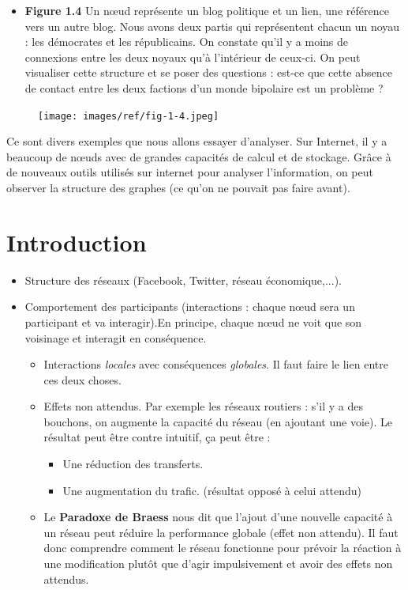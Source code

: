 \begin{itemize}
	\item \textbf{Figure 1.4} Un nœud représente un blog politique et un lien, une référence vers un autre blog. Nous avons deux partis qui représentent chacun un noyau : les démocrates et les républicains. On constate qu'il y a moins de connexions entre les deux noyaux qu'à l'intérieur de ceux-ci. On peut visualiser cette structure et se poser des questions : est-ce que cette absence de contact entre les deux factions d'un monde bipolaire est un problème ?
\end{itemize}

\begin{figure}[!H]
\centering
\texttt{[image: images/ref/fig-1-4.jpeg]}
\end{figure}

Ce sont divers exemples que nous allons essayer d'analyser. Sur Internet, il y a beaucoup de nœuds avec de grandes capacités de calcul et de stockage. Grâce à de nouveaux outils utilisés sur internet pour analyser l'information, on peut observer la structure des graphes (ce qu'on ne pouvait pas faire avant).

\section{Introduction}
\begin{itemize}
\item Structure des réseaux (Facebook, Twitter, réseau économique,...).
\item Comportement des participants (interactions : chaque nœud sera un participant et va interagir).En principe, chaque nœud ne voit que son voisinage et interagit en conséquence.

\begin{itemize}
	\item Interactions \textit{locales} avec conséquences \textit{globales}.
	Il faut faire le lien entre ces deux choses.
	\item Effets non attendus. Par exemple les réseaux routiers : s'il y a des bouchons, on augmente la capacité du réseau (en ajoutant une voie). 
	Le résultat peut être contre intuitif, ça peut être :
	\begin{itemize} 
		\item Une réduction des transferts.
		\item Une augmentation du trafic. (résultat opposé à celui attendu)
	\end{itemize}	
	\item Le \textbf{Paradoxe de Braess} nous dit que l'ajout d'une nouvelle capacité à un réseau peut réduire la performance globale (effet non attendu).
Il faut donc comprendre comment le réseau fonctionne pour prévoir la réaction à une modification plutôt que d'agir impulsivement et avoir des effets non attendus.
\end{itemize}
\end{itemize}

